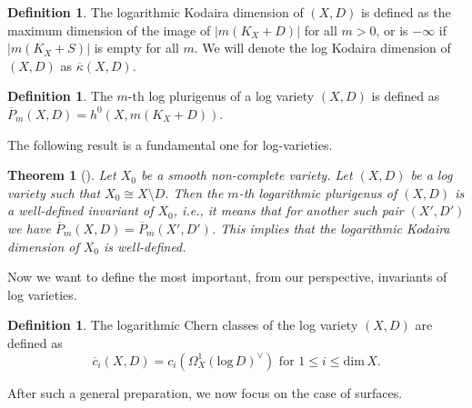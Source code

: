 \documentclass{article}
\theoremstyle{plain}
\newtheorem{theorem}[thm]{Theorem}
\theoremstyle{definition}
\newtheorem{definition}[thm]{Definition}
\numberwithin{equation}{section}
\begin{document}
\begin{definition}
The logarithmic Kodaira dimension of $(X,D)$ is defined as the maximum dimension of the image of $|m(K_{X}+D)|$ for all $m > 0$, or is $-\infty$ if $|m(K_{X}+S)|$ is empty for all $m$. We will denote the log Kodaira dimension of $(X,D)$ as $\overline{\kappa}(X,D)$.
\end{definition}
\begin{definition}
The $m$-th log plurigenus of a log variety $(X,D)$ is defined as $\overline{P}_{m}(X,D) = h^{0}(X, m(K_{X}+D))$.
\end{definition}
The following result is a fundamental one for log-varieties.
\begin{theorem}[{\cite[p. 60]{MM02}}]
Let $X_{0}$ be a smooth non-complete variety. Let $(X,D)$ be a log variety such that $X_{0} \cong X \setminus D$. Then the $m$-th logarithmic plurigenus of $(X,D)$ is a well-defined invariant of $X_{0}$, i.e., it means that for another such pair $(X',D')$ we have $\overline{P}_{m}(X,D) = \overline{P}_{m}(X',D')$. This implies that the logarithmic Kodaira dimension of $X_{0}$ is well-defined.
\end{theorem}
Now we want to define the most important, from our perspective, invariants of log varieties.
\begin{definition}
\label{chgen}
The logarithmic Chern classes of the log variety $(X,D)$ are defined as
\[\overline{c}_{i}(X,D) = c_{i}(\Omega_{X}^{1}(\textrm{log}\,D)^{\vee}) \text{ for } 1 \leq i \leq \textrm{dim}\, X.\]
\end{definition}
After such a general preparation, we now focus on the case of surfaces.
\end{document}
